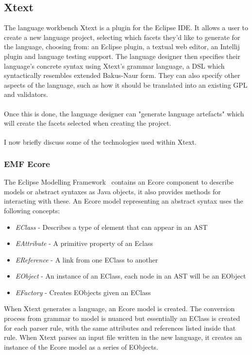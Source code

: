 \documentclass{article}
\begin{document}
\subsection{Xtext}\label{xtext}
The language workbench Xtext is a plugin for the Eclipse IDE. It allows a user to create a new language project, selecting which facets they'd like to generate for the language, choosing from: an Eclipse plugin, a textual web editor, an Intellij plugin and language testing support. The language designer then specifies their language's concrete syntax using Xtext's grammar language, a DSL which syntactically resembles extended Bakus-Naur form. They can also specify other aspects of the language, such as how it should be translated into an existing GPL and validators.
\\
\\
Once this is done, the language designer can "generate language artefacts" which will create the facets selected when creating the project. 
\\
\\
I now briefly discuss some of the technologies used within Xtext.
\subsubsection{EMF Ecore}\label{emf}
The Eclipse Modelling Framework~\cite{emf} contains an Ecore component to describe models or abstract syntaxes as Java objects, it also provides methods for interacting with these. An Ecore model representing an abstract syntax uses the following concepts:
\begin{itemize}
\item \emph{EClass} - Describes a type of element that can appear in an AST
\item \emph{EAttribute} - A primitive property of an Eclass
\item \emph{EReference} - A link from one EClass to another
\item \emph{EObject} - An instance of an EClass, each node in an AST will be an EObject
\item \emph{EFactory} - Creates EObjects given an EClass
\end{itemize}
When Xtext generates a language, an Ecore model is created. The conversion process from grammar to model is nuanced but essentially an EClass is created for each parser rule, with the same attributes and references listed inside that rule. When Xtext parses an input file written in the new language, it creates an instance of the Ecore model as a series of EObjects.
\end{document}
